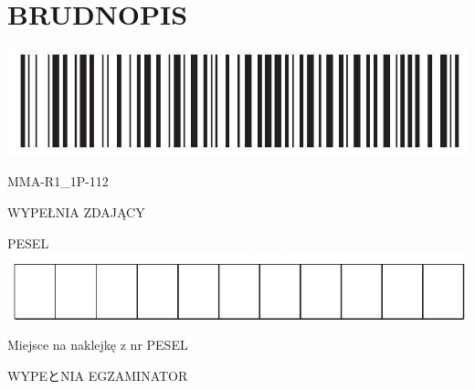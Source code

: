 \documentclass[10pt]{article}
\begin{document}
\section*{BRUDNOPIS}
\begin{center}
\includegraphics[max width=\textwidth]{2024_11_21_b36d8cbb94edb763da2cg-21(1)}
\end{center}

MMA-R1\_1P-112

WYPEŁNIA ZDAJĄCY

PESEL\\
\includegraphics[max width=\textwidth, center]{2024_11_21_b36d8cbb94edb763da2cg-21}

Miejsce na naklejkę z nr PESEL

WYPEとNIA EGZAMINATOR
\end{document}
